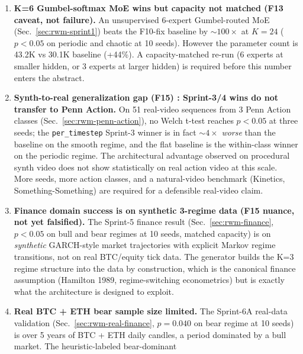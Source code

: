\documentclass[11pt,a4paper]{article}
\begin{document}
\begin{enumerate}[label=L\arabic*., leftmargin=*]
  produce rollouts with $\mathrm{MSE}\sim 10^8$ on smooth ---
  \emph{worse} than the pre-fix RWM-orig of $\S$\ref{sec:rwm-rollout}.
  The orthogonal parametrization is too rigid under multi-step
  gradient pressure. A softer alternative (spectral-norm clipping
  with $\rho < 1$, no orthogonality) is the natural next try.
\item \textbf{K{=}6 Gumbel-softmax MoE wins but capacity not matched
  (F13 caveat, not failure).} An unsupervised 6-expert Gumbel-routed
  MoE (Sec.~\ref{sec:rwm-sprint1}) beats the F10-fix baseline by
  $\sim 100{\times}$ at $K{=}24$ ($p{<}0.05$ on periodic and chaotic
  at 10 seeds). However the parameter count is 43.2K vs 30.1K
  baseline (+44\%). A capacity-matched re-run (6 experts at smaller
  hidden, or 3 experts at larger hidden) is required before this
  number enters the abstract.
\item \textbf{Synth-to-real generalization gap (F15) : Sprint-3/4
  wins do not transfer to Penn Action.} On 51 real-video sequences
  from $3$ Penn Action classes (Sec.~\ref{sec:rwm-penn-action}),
  no Welch t-test reaches $p{<}0.05$ at three seeds; the
  \texttt{per\_timestep} Sprint-3 winner is in fact $\sim 4{\times}$
  \emph{worse} than the baseline on the smooth regime, and the flat
  baseline is the within-class winner on the periodic regime. The
  architectural advantage observed on procedural synth video does
  not show statistically on real action video at this scale. More
  seeds, more action classes, and a natural-video benchmark
  (Kinetics, Something-Something) are required for a defensible
  real-video claim.
\item \textbf{Finance domain success is on synthetic 3-regime data
  (F15 nuance, not yet falsified).} The Sprint-5 finance result
  (Sec.~\ref{sec:rwm-finance}, $p{<}0.05$ on bull and bear regimes
  at 10 seeds, matched capacity) is on \emph{synthetic} GARCH-style
  market trajectories with explicit Markov regime transitions, not
  on real BTC/equity tick data. The generator builds the K=3 regime
  structure into the data by construction, which is the canonical
  finance assumption (Hamilton 1989, regime-switching econometrics)
  but is exactly what the architecture is designed to exploit.
\item \textbf{Real BTC + ETH bear sample size limited.} The
  Sprint-6A real-data validation
  (Sec.~\ref{sec:rwm-real-finance}, $p{=}0.040$ on bear regime at 10
  seeds) is over 5 years of BTC + ETH daily candles, a period
  dominated by a bull market. The heuristic-labeled bear-dominant

\end{enumerate}
\end{document}

